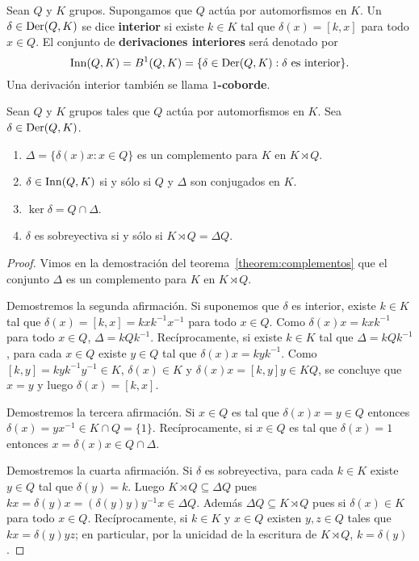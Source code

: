 \begin{definition}
	Sean $Q$ y $K$ grupos. Supongamos que $Q$ actúa por automorfismos en $K$.
	Un $\delta\in\operatorname{Der}(Q,K)$ se dice \textbf{interior} si existe $k\in K$ tal
	que $\delta(x)=[k,x]$ para todo $x\in Q$. El conjunto de
	\textbf{derivaciones interiores} será denotado por
	\[
		\mathrm{Inn}(Q,K)=B^1(Q,K)=\{\delta\in\operatorname{Der}(Q,K):\text{$\delta$ es interior}\}.
	\]
	Una derivación interior también se llama \textbf{$1$-coborde}.
\end{definition}

\begin{theorem}[Sysak]
	\label{theorem:Sysak}
	Sean $Q$ y $K$ grupos tales que $Q$ actúa por automorfismos en $K$. Sea
	$\delta\in\operatorname{Der}(Q,K)$.
	\begin{enumerate}
		\item $\Delta=\{\delta(x)x:x\in Q\}$ es un complemento para $K$ en $K\rtimes Q$.
		\item $\delta\in\mathrm{Inn}(Q,K)$ si y sólo si $Q$ y $\Delta$ son conjugados en
			$K$.
		\item $\ker\delta=Q\cap\Delta$.
		\item $\delta$ es sobreyectiva si y sólo si $K\rtimes Q=\Delta Q$.
	\end{enumerate}
\end{theorem}

\begin{proof}
	Vimos en la demostración del teorema~\ref{theorem:complementos} que
	el conjunto $\Delta$ es un complemento para $K$ en $K\rtimes Q$. 

	Demostremos la segunda afirmación. Si suponemos que $\delta$ es interior,
	existe $k\in K$ tal que $\delta(x)=[k,x]=kxk^{-1}x^{-1}$ para todo $x\in
	Q$. Como $\delta(x)x=kxk^{-1}$ para todo $x\in Q$,  $\Delta=kQk^{-1}$.
	Recíprocamente, si existe $k\in K$ tal que $\Delta=kQk^{-1}$, para cada
	$x\in Q$ existe $y\in Q$ tal que $\delta(x)x=kyk^{-1}$. Como
	$[k,y]=kyk^{-1}y^{-1}\in K$, $\delta(x)\in K$ y $\delta(x)x=[k,y]y\in KQ$,
	se concluye que $x=y$ y luego $\delta(x)=[k,x]$. 

	Demostremos la tercera afirmación. Si $x\in Q$ es tal que $\delta(x)x=y\in
	Q$ entonces $\delta(x)=yx^{-1}\in K\cap Q=\{1\}$. Recíprocamente, si $x\in Q$
	es tal que $\delta(x)=1$ entonces $x=\delta(x)x\in Q\cap\Delta$. 

	Demostremos la cuarta afirmación. Si $\delta$ es sobreyectiva, para cada
	$k\in K$ existe $y\in Q$ tal que $\delta(y)=k$. Luego $K\rtimes Q\subseteq
	\Delta Q$ pues $kx=\delta(y)x=(\delta(y)y)y^{-1}x\in \Delta Q$. Además
	$\Delta Q\subseteq K\rtimes Q$ pues si $\delta(x)\in K$ para todo $x\in Q$.
	Recíprocamente, si $k\in K$ y $x\in Q$ existen 
	$y,z\in Q$ tales que $kx=\delta(y)yz$; en particular, 
	por la unicidad de la escritura de $K\rtimes Q$,
	$k=\delta(y)$. 
\end{proof}

